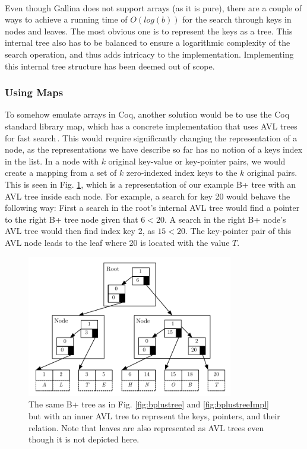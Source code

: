 \paragraph{}
Even though Gallina does not support arrays (as it is pure), there are a couple of ways to achieve a running time of $O(log(b))$ for the search through keys in nodes and leaves. The most obvious one is to represent the keys as a tree. This internal tree also has to be balanced to ensure a logarithmic complexity of the search operation, and thus adds intricacy to the implementation. Implementing this internal tree structure has been deemed out of scope. 

\subsubsection{Using Maps}
To somehow emulate arrays in Coq, another solution would be to use the Coq standard library map, which has a concrete implementation that uses AVL trees for fast search\,\cite{fmapavl}. This would require significantly changing the representation of a node, as the representations we have describe so far has no notion of a keys index in the list. In a node with $k$ original key-value or key-pointer pairs, we would create a mapping from a set of $k$ zero-indexed index keys to the $k$ original pairs. This is seen in Fig. \ref{fig:bplustreeAVLImpl}, which is a representation of our example B+ tree with an AVL tree inside each node. For example, a search for key 20 would behave the following way: First a search in the root's internal AVL tree would find a pointer to the right B+ tree node given that $6 <20$. A search in the right B+ node's AVL tree would then find index key 2, as $15 < 20$. The key-pointer pair of this AVL node leads to the leaf where 20 is located with the value $T$.

\begin{figure}
 \centering
   \includegraphics[width=90mm]{diagrams/BPlusTreeMapImpl.pdf}
 \caption{The same B+ tree as in Fig. \ref{fig:bplustree} and \ref{fig:bplustreeImpl} but with an inner AVL tree to represent the keys, pointers, and their relation. Note that leaves are also represented as AVL trees even though it is not depicted here.}
 \label{fig:bplustreeAVLImpl}
\end{figure}

